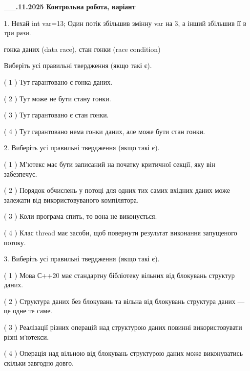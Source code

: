 \documentclass[12pt, ukrainian]{article}
\begin{document}
\newpage
\begin {large}

\textbf{\_\_.11.2025 Контрольна робота, варіант  }\par


{
1. Нехай int var=13; Один потік збільшив змінну var на 3, а інший збільшив її в три рази.

гонка даних (data race), стан гонки (race condition)

Виберіть усі правильні твердження (якщо такі є).\par
\vspace{2mm}
( 1 ) Тут гарантовано є гонка даних.%

( 2 ) Тут може не бути стану гонки.%

( 3 ) Тут гарантовано є стан гонки.%

( 4 ) Тут гарантовано нема гонки даних, але може бути стан гонки.%


2. Виберіть усі правильні твердження (якщо такі є).\par
\vspace{2mm}

( 1 ) М’ютекс має бути записаний на початку критичної секції, яку він забезпечує.%

( 2 ) Порядок обчислень у потоці для одних тих самих вхідних даних може залежати від використовуваного компілятора.%

( 3 ) Коли програма спить, то вона не виконується.%

( 4 ) Клас thread має засоби, щоб повернути результат виконання запущеного потоку.%


3. Виберіть усі правильні твердження (якщо такі є).\par
\vspace{2mm}

( 1 ) Мова С++20 має стандартну бібліотеку вільних від блокувань структур даних.%

( 2 ) Структура даних без блокувань та вільна від блокувань структура даних --- це одне те саме.%

( 3 ) Реалізації різних операцій над структурою даних повинні використовувати різні м’ютекси.%

( 4 ) Операція над вільною від блокувань структурою даних може виконуватись скільки завгодно довго.%


}
\end{large}
\end{document}
